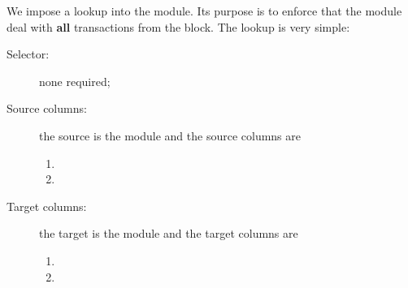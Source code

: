 We impose a lookup into the \hubMod{} module. Its purpose is to enforce that the \hubMod{} module deal with \textbf{all} transactions from the block. The lookup is very simple:
\begin{description}
	\item[Selector:] none required;
	\item[Source columns:]
		the source is the \userTxnDataMod{} module and the source columns are
		\begin{multicols}{2}
			\begin{enumerate}
				\item \block{}
				\item \locAbs{}
			\end{enumerate}
		\end{multicols}
	\item[Target columns:]
		the target is the \hubMod{} module and the target columns are
		\begin{multicols}{2}
			\begin{enumerate}
				\item \blockNumber{}
				\item \userTransactionNumber{}
			\end{enumerate}
		\end{multicols}
\end{description}
